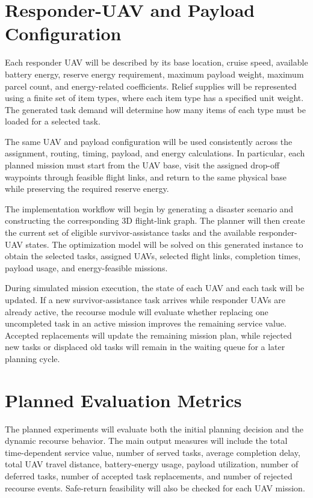 \section{Responder-UAV and Payload Configuration}

Each responder UAV will be described by its base location, cruise speed,
available battery energy, reserve energy requirement, maximum payload weight,
maximum parcel count, and energy-related coefficients. Relief supplies will be
represented using a finite set of item types, where each item type has a
specified unit weight. The generated task demand will determine how many items
of each type must be loaded for a selected task.

The same UAV and payload configuration will be used consistently across the
assignment, routing, timing, payload, and energy calculations. In particular,
each planned mission must start from the UAV base, visit the assigned
drop-off waypoints through feasible flight links, and return to the same
physical base while preserving the required reserve energy.



The implementation workflow will begin by generating a disaster scenario and
constructing the corresponding 3D flight-link graph. The planner will then
create the current set of eligible survivor-assistance tasks and the available
responder-UAV states. The optimization model will be solved on this generated
instance to obtain the selected tasks, assigned UAVs, selected flight links,
completion times, payload usage, and energy-feasible missions.

During simulated mission execution, the state of each UAV and each task will
be updated. If a new survivor-assistance task arrives while responder UAVs are
already active, the recourse module will evaluate whether replacing one
uncompleted task in an active mission improves the remaining service value.
Accepted replacements will update the remaining mission plan, while rejected
new tasks or displaced old tasks will remain in the waiting queue for a later
planning cycle.

\section{Planned Evaluation Metrics}

The planned experiments will evaluate both the initial planning decision and
the dynamic recourse behavior. The main output measures will include the total
time-dependent service value, number of served tasks, average completion
delay, total UAV travel distance, battery-energy usage, payload utilization,
number of deferred tasks, number of accepted task replacements, and number of
rejected recourse events. Safe-return feasibility will also be checked for
each UAV mission.

